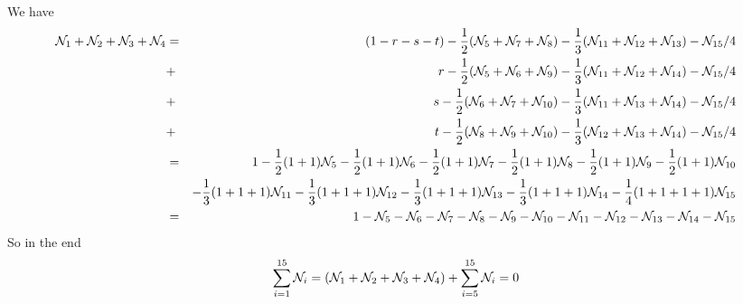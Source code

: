 We have
\begin{eqnarray}
\bN_1+\bN_2+\bN_3+\bN_4 
&=& (1-r-s-t) -\frac12 (\bN_5+\bN_7+\bN_8)-\frac13(\bN_{11}+\bN_{12}+\bN_{13})-\bN_{15}/4 \nn\\
&+& r-\frac12(\bN_5+\bN_6+\bN_9)    -\frac13(\bN_{11}+\bN_{12}+\bN_{14}) -\bN_{15}/4 \\
&+& s-\frac12(\bN_6+\bN_7+\bN_{10}) -\frac13(\bN_{11}+\bN_{13}+\bN_{14}) -\bN_{15}/4 \\
&+& t-\frac12(\bN_8+\bN_9+\bN_{10}) -\frac13(\bN_{12}+\bN_{13}+\bN_{14}) -\bN_{15}/4 \\
&=& 1 -\frac12(1+1)\bN_5 -\frac12(1+1)\bN_6 -\frac12(1+1)\bN_7 -\frac12(1+1)\bN_8 -\frac12(1+1)\bN_9 -\frac12(1+1)\bN_{10}    \nn\\
&&  -\frac13(1+1+1)\bN_{11} -\frac13(1+1+1)\bN_{12} -\frac13(1+1+1)\bN_{13} -\frac13(1+1+1)\bN_{14} 
-\frac{1}{4}(1+1+1+1)\bN_{15} \nn\\
&=& 1 -\bN_5 -\bN_6 -\bN_7 -\bN_8 -\bN_{9} -\bN_{10}
      -\bN_{11} -\bN_{12} -\bN_{13} -\bN_{14} -\bN_{15} 
\end{eqnarray}
So in the end
\[
\sum_{i=1}^{15} \bN_i = (\bN_1+\bN_2+\bN_3+\bN_4)  + \sum_{i=5}^{15} \bN_i = 0
\]

